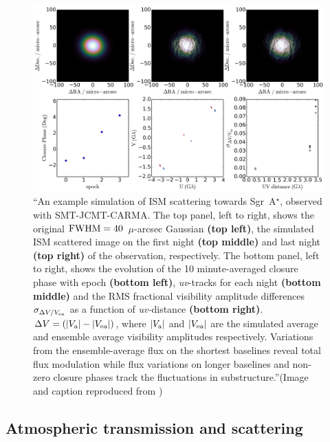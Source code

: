 \begin{figure}[h!]
\includegraphics[width=\columnwidth]{Images/ism}
\caption[An example simulation of ISM scattering towards Sgr~A$^{\star}$, observed with SMT-JCMT-CARMA over four consecutive days. We use a Gaussian source model, and illustrate the effects on visibility amplitude, closure phase and the scattered image.]{``An example simulation of ISM scattering towards Sgr~A$^{\star}$, observed with SMT-JCMT-CARMA.  The top panel, left to right, shows the original $\rm FWHM = 40$~$\mu$-arcsec Gaussian {\bf (top left)}, the simulated ISM scattered image on the first night {\bf (top middle)} and last night {\bf (top right)} of the observation, respectively.  The bottom panel, left to right,  shows the evolution of the 10 minute-averaged closure phase with epoch {\bf (bottom left)}, {\sl uv}-tracks for each night {\bf (bottom middle)} and the RMS fractional visibility amplitude differences $\sigma_{\Delta V /V_{\rm ea}}$ as a function of {\sl uv-}distance {\bf (bottom right)}. $ \Delta V= (|V_{\rm a}|-|V_{\rm ea}|)$, where $|V_{\rm a}|$ and $|V_{\rm ea}|$ are the simulated average and ensemble average visibility amplitudes respectively. Variations from the ensemble-average flux on the shortest baselines reveal total flux modulation while flux variations on longer baselines and non-zero closure phases track the fluctuations in substructure.''(Image and caption reproduced from \citet{Blecher_2016}) \label{ISM_sequence}%
}
\end{figure}

\subsection{Atmospheric transmission and scattering}

